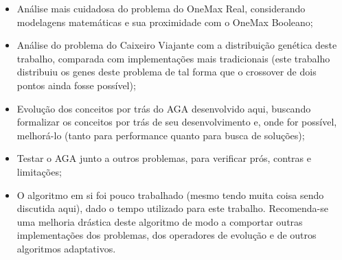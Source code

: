 \begin{itemize}

	\item Análise mais cuidadosa do problema do OneMax Real, considerando modelagens matemáticas e sua proximidade com o OneMax Booleano;

	\item Análise do problema do Caixeiro Viajante com a distribuição genética deste trabalho, comparada com implementações mais tradicionais (este trabalho distribuiu os genes deste problema de tal forma que o crossover de dois pontos ainda fosse possível);

	\item Evolução dos conceitos por trás do AGA desenvolvido aqui, buscando formalizar os conceitos por trás de seu desenvolvimento e, onde for possível, melhorá-lo (tanto para performance quanto para busca de soluções);

	\item Testar o AGA junto a outros problemas, para verificar prós, contras e limitações;

	\item O algoritmo em si foi pouco trabalhado (mesmo tendo muita coisa sendo discutida aqui), dado o tempo utilizado para este trabalho. Recomenda-se uma melhoria drástica deste algoritmo de modo a comportar outras implementações dos problemas, dos operadores de evolução e de outros algoritmos adaptativos.

\end{itemize}

